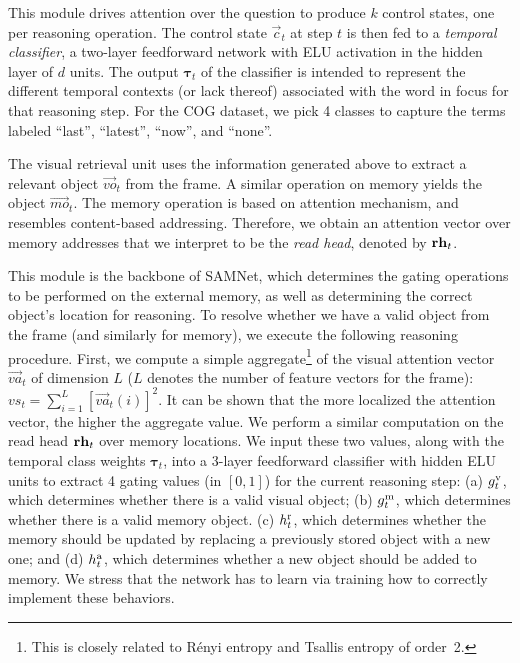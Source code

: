 This module drives attention over the question to produce $k$ control states, one per reasoning operation.
The control state $\vec{c}_t$ at step $t$ is then fed to a \emph{temporal classifier}, 
a two-layer feedforward network with ELU activation in the hidden layer of $d$ units.
The output $\bm{\tau}_t$ of the classifier is intended to represent the different temporal contexts (or lack thereof) associated with the word in focus for that reasoning step.	
For the COG dataset, we pick 4 classes to capture the terms labeled ``last'', ``latest'', ``now'', and ``none''.

The visual retrieval unit uses the information generated above to extract a relevant object $\vec{vo}_t$ from the frame.
A similar operation on memory yields the object $\vec{mo}_t$. The memory operation is based on attention mechanism, and resembles content-based addressing. Therefore, we obtain an attention vector over memory addresses that we interpret to be the \emph{read head}, denoted by $\mathbf{rh}_t$.

This module is the backbone of SAMNet, which determines the gating operations to be performed on the external memory, as well as determining the correct object's location for reasoning.
To resolve whether we have a valid object from the frame (and similarly for memory), we execute the following reasoning procedure.
First, we compute a simple aggregate\footnote{%
	This is closely related to R\'{e}nyi entropy and Tsallis entropy of order~2.} of the visual attention vector $\vec{va}_t$ of dimension $L$ ($L$ denotes the number of feature vectors for the frame):
$vs_t = \sum_{i=1}^L [\vec{va}_t(i)]^2$. It can be shown that the more localized the attention
vector, the higher the aggregate value.
We perform a similar computation on the read head $\mathbf{rh}_t$ over memory locations.
We input these two values, along with the temporal class weights $\bm{\tau}_t$, into a 3-layer feedforward classifier with hidden ELU units to extract 4 gating values (in $[0,1]$) for the current reasoning step:
(a) $g^{\mathrm{v}}_t$, which determines whether there is a valid visual object;
(b) $g^{\mathrm{m}}_t$, which determines whether there is a valid memory object. 
(c) $h^{\mathrm{r}}_t$, which determines whether the memory should be updated by replacing a previously stored object with a new one; and
(d) $h^{\mathrm{a}}_t$, which determines whether a new object should be added to memory.
We stress that the network has to learn via training how to correctly implement these behaviors.

